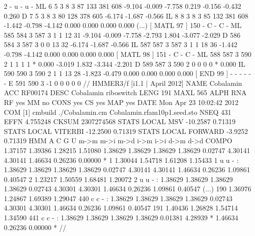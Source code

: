 \begin{tinysreoutput}
                                             [ MATL    2 ]      2      - u - u -
    ML     6     5 3     8     3    87   133   381   608  -9.104  -0.009  -7.758                          0.219 -0.156 -0.432  0.260 
     D     7     5 3     8     3    80   128   378   605  -6.174  -1.687  -0.566                         
    IL     8     8 3     8     3    85   132   381   608  -1.442  -0.798  -4.142                          0.000  0.000  0.000  0.000 
(...)
                                             [ MATL   97 ]    150      - C - C -
    ML   585   584 3   587     3     1     1    12    31  -9.104  -0.009  -7.758                         -2.793  1.804 -3.077 -2.029 
     D   586   584 3   587     3     0     0    13    32  -6.174  -1.687  -0.566                         
    IL   587   587 3   587     3     1     1    18    36  -1.442  -0.798  -4.142                          0.000  0.000  0.000  0.000 
                                             [ MATL   98 ]    151      - C - C -
    ML   588   587 3   590     2     1     1     1     1       *   0.000                                 -3.019  1.832 -3.344 -2.201 
     D   589   587 3   590     2     0     0     0     0       *   0.000                                 
    IL   590   590 3   590     2     1     1    13    28  -1.823  -0.479                                  0.000  0.000  0.000  0.000 
                                             [ END    99 ]      -      - - - - -
     E   591   590 3    -1     0     0     0     0     0                                                 
//
HMMER3/f [i1.1 | April 2012]
NAME  Cobalamin
ACC   RF00174
DESC  Cobalamin riboswitch
LENG  191
MAXL  565
ALPH  RNA
RF    yes
MM    no
CONS  yes
CS    yes
MAP   yes
DATE  Mon Apr 23 10:02:42 2012
COM   [1] cmbuild ./Cobalamin.cm Cobalamin.rfam10p1.seed.sto
NSEQ  431
EFFN  4.755248
CKSUM 2307274568
STATS LOCAL MSV      -10.2587  0.71319
STATS LOCAL VITERBI  -12.2500  0.71319
STATS LOCAL FORWARD   -3.9252  0.71319
HMM          A        C        G        U   
            m->m     m->i     m->d     i->m     i->i     d->m     d->d
  COMPO   1.37157  1.39386  1.28215  1.51080
          1.38629  1.38629  1.38629  1.38629
          0.02747  4.30141  4.30141  1.46634  0.26236  0.00000        *
      1   1.30044  1.54718  1.61208  1.15433      1 u u - :
          1.38629  1.38629  1.38629  1.38629
          0.02747  4.30141  4.30141  1.46634  0.26236  1.09861  0.40547
      2   1.23217  1.50559  1.68481  1.20072      2 u u - :
          1.38629  1.38629  1.38629  1.38629
          0.02743  4.30301  4.30301  1.46634  0.26236  1.09861  0.40547
(...)
    190   1.36976  1.24867  1.69389  1.29047    440 c c - :
          1.38629  1.38629  1.38629  1.38629
          0.02743  4.30301  4.30301  1.46634  0.26236  1.09861  0.40547
    191   1.40436  1.26828  1.54714  1.34590    441 c c - :
          1.38629  1.38629  1.38629  1.38629
          0.01381  4.28939        *  1.46634  0.26236  0.00000        *
//
\end{tinysreoutput}

